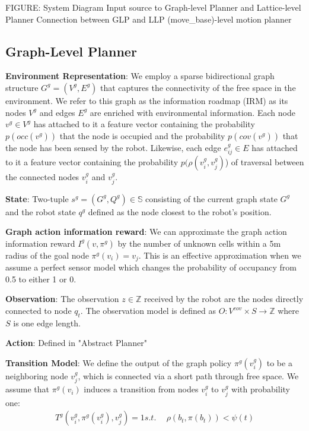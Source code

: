 \documentclass{article}
\newcommand{\ph}[1]{{\textbf{#1}:}} %
\begin{document}
FIGURE: System Diagram
Input source to Graph-level Planner and Lattice-level Planner 
Connection between GLP and LLP
(move\_base)-level motion planner





\subsection{Graph-Level Planner} 


\ph{Environment Representation} We employ a sparse bidirectional graph structure $G^g = (V^g, E^g)$ that captures the connectivity of the free space in the environment. We refer to this graph as the information roadmap (IRM) as its nodes $V^g$ and edges $E^g$ are enriched with environmental information. Each node $v^g \in V^g$ has attached to it a feature vector containing the probability $p(occ(v^g))$ that the node is occupied and the probability $p(cov(v^g))$ that the node has been sensed by the robot. Likewise, each edge $e_{ij}^g \in E$ has attached to it a feature vector containing the probability $p(\rho(v_i^g, v_j^g)$) of traversal between the connected nodes $v_i^g$ and $v_j^g$.

\ph{State} Two-tuple $s^g=(G^g, Q^g) \in \mathbb{S}$ consisting of the current graph state $G^g$ and the robot state $q^g$ defined as the node closest to the robot's position. 

\ph{Graph action information reward}
We can approximate the graph action information reward $I^g(v, \pi^g)$ by the number of unknown cells within a 5m radius of the goal node $\pi^g(v_i)=v_j$.  This is an effective approximation when we assume a perfect sensor model which changes the probability of occupancy from 0.5 to either 1 or 0.  

\ph{Observation} The observation $z \in \mathbb{Z}$ received by the robot are the nodes directly connected to node $q_t$. The observation model is defined as $O: V^{cov} \times S \rightarrow \mathbb{Z}$ where $S$ is one edge length.

\ph{Action} Defined in "Abstract Planner"

\ph{Transition Model} We define the output of the graph policy $\pi^g(v_i^g)$ to be a neighboring node $v_j^g$, which is connected via a short path through free space. We assume that $\pi^{g}(v_i)$ induces a transition from nodes $v_i^g$ to $v_j^g$ with probability one:
\begin{align}
    T^{g} (v_i^g, \pi^g(v_i^g), v_j^g) = 1
    s.t.~&~\rho(b_t,\pi(b_t)) < \psi(t)
\end{align}
\end{document}
